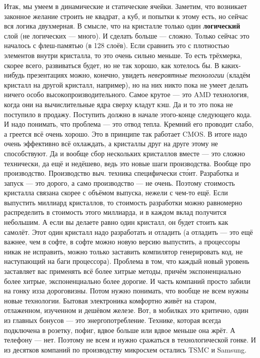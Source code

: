 \documentclass{article}
\begin{document}
    Итак, мы умеем в динамические и статические ячейки. Заметим, что возникает законное желание строить не квадрат, а куб, и попытки к этому есть, но сейчас вся логика двухмерная. В смысле, что на кристалле только один \textbf{логический} слой (не логических --- много). И сделать больше --- сложно. Только сейчас это началось с флеш-памятью (в 128 слоёв). Если сравнить это с плотностью элементов внутри кристалла, то это очень сильно меньше. То есть трёхмерка, скорее всего, развиваться будет, но не так хорошо, как хотелось бы. В каких-нибудь презентациях можно, конечно, увидеть \textit{невероятные технологии} (кладём кристалл на другой кристалл, например), но на них никто пока не умеет делать ничего особо высокопроизводительного. Самое крутое --- это AMD технология, когда они на вычислительные ядра сверху кладут кэш. Да и то это пока не поступило в продажу. Поступить должно в начале этого-конце следующего кода. И надо понимать, что проблема --- это отвод тепла. Кремний его проводит слабо, а греется всё очень хорошо. Это в принципе так работает CMOS. В итоге надо очень эффективно всё охлаждать, а кристаллы друг на друге этому не способствуют. Да и вообще сбор нескольких кристаллов вместе --- это сложно технически, да ещё и недёшево, ведь это новые шаги производства. Вообще про производство. Производство выч. техника специфически ст\'{о}ит. Разработка и запуск --- это дорого, а само производство --- не очень. Поэтому стоимость кристалла связана скорее с объёмом выпуска, нежели с чем-то ещё. Если выпустить миллиард кристаллов, то стоимость разработки можно равномерно распределить в стоимость этого миллиарда, и в каждом вклад получится небольшим. А если вы делаете равно один кристалл, он будет стоить как самолёт. Этот один кристалл надо разработать и отладить (а отладить --- это ещё важнее, чем в софте, в софте можно новую версию выпустить, а процессоры никак не исправить, можно только заставить компилятор генерировать код, не наступающий на баги процессора). Проблема в том, что каждый новый уровень заставляет вас применять всё более хитрые методы, причём экспоненциально более хитрые, экспоненциально более дорогие. И часть компаний просто забили на гонку изза дороговизны. Потом нужно понимать, что вообще не всем нужны новые технологии. Бытовая электроника комфортно живёт на старом, отлаженном, изученном и дешёвом железе. Вот, в мобилках это критично, один из главных бонусов --- это энергопотребление. Технике, которая всегда подключена в розетку, пофиг, вдвое больше или вдвое меньше она жрёт. А телефону --- нет. Поэтому не всем и нужно сражаться в технологической гонке. И из десятков компаний по производству микросхем остались TSMC и Samsung.\\
\end{document}
